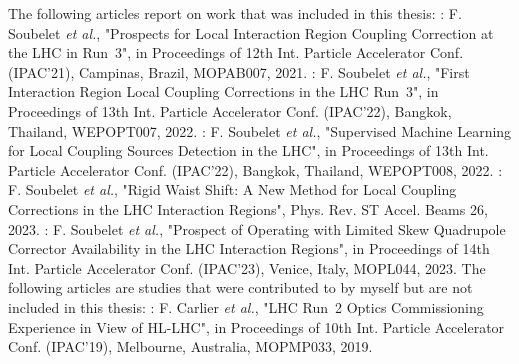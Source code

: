 \begin{declaration}
The following articles report on work that was included in this thesis:
\newline \newline
\noindent\cite{IPAC:Soubelet:Prospect_IR_Coupling_Correction_LHC_Run3}: F. Soubelet \textit{et al.}, "Prospects for Local Interaction Region Coupling Correction at the LHC in Run~\num{3}", in Proceedings of \num{12}th Int. Particle Accelerator Conf. (IPAC'21), Campinas, Brazil, MOPAB007, \num{2021}.
\newline \newline
\noindent\cite{IPAC:Soubelet:First_Corrections_IR_Local_Coupling_LHC_Run3}: F. Soubelet \textit{et al.}, "First Interaction Region Local Coupling Corrections in the LHC Run~\num{3}", in Proceedings of \num{13}th Int. Particle Accelerator Conf. (IPAC'22), Bangkok, Thailand, WEPOPT007, \num{2022}.
\newline \newline
\noindent\cite{IPAC:Soubelet:Supervised_Machine_Learning_Local_Coupling_Sources_Detection_LHC}: F. Soubelet \textit{et al.}, "Supervised Machine Learning for Local Coupling Sources Detection in the LHC", in Proceedings of \num{13}th Int. Particle Accelerator Conf. (IPAC'22), Bangkok, Thailand, WEPOPT008, \num{2022}.
\newline \newline
\noindent\cite{PRAB:Soubelet:Rigid_Waist_Shift_Method_Local_Coupling_Correction_LHC_IR}: F. Soubelet \textit{et al.}, "Rigid Waist Shift: A New Method for Local Coupling Corrections in the LHC Interaction Regions", Phys. Rev. ST Accel. Beams \num{26}, \num{2023}.
\newline \newline
\noindent\cite{IPAC:Soubelet:Prospect_Operating_Limited_Skew_Quadrupole_Corrector_Availability_LHC_IR}: F. Soubelet \textit{et al.}, "Prospect of Operating with Limited Skew Quadrupole Corrector Availability in the LHC Interaction Regions", in Proceedings of \num{14}th Int. Particle Accelerator Conf. (IPAC'23), Venice, Italy, MOPL044, \num{2023}.
\newline
\newline
\indent
The following articles are studies that were contributed to by myself but are not included in this thesis:
\newline \newline
\noindent\cite{IPAC:Tomas:Run2_Experience_View_LHC_HLLHC}: F. Carlier \textit{et al.}, "LHC Run~\num{2} Optics Commissioning Experience in View of HL-LHC", in Proceedings of \num{10}th Int. Particle Accelerator Conf. (IPAC'19), Melbourne, Australia, MOPMP033, \num{2019}.

\end{declaration}
